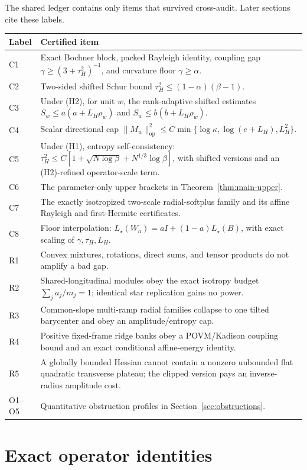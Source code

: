 \documentclass[11pt]{article}
\numberwithin{equation}{section}
\newcommand{\op}{\mathrm{op}}
\begin{document}
The shared ledger contains only items that survived cross-audit.  Later
sections cite these labels.
\begin{longtable}{@{}p{}p{}@{}}
\toprule
Label & Certified item\\
\midrule
\endhead
C1 & Exact Bochner block, packed Rayleigh identity, coupling gap
$\gamma\ge(3+\tau_H^2)^{-1}$, and curvature floor $\gamma\ge\alpha$.\\
C2 & Two-sided shifted Schur bound
$\tau_H^2\le(1-\alpha)(\beta-1)$.\\
C3 & Under (H2), for unit $w$, the rank-adaptive shifted estimates
$S_w\le a(a+L_H\rho_w)$ and $S_w\le b(b+L_H\rho_w)$.\\
C4 & Scalar directional cap
$\|M_w\|_{\op}^2\le C\min\{\log\kappa,\log(e+L_H),L_H^2\}$.\\
C5 & Under (H1), entropy self-consistency:
$\tau_H^2\le C[1+\sqrt{N\log\beta}+N^{1/3}\log\beta]$, with shifted
versions and an (H2)-refined operator-scale term.\\
C6 & The parameter-only upper brackets in Theorem~\ref{thm:main-upper}.\\
C7 & The exactly isotropized two-scale radial-softplus family and its affine
Rayleigh and first-Hermite certificates.\\
C8 & Floor interpolation:
$L_\star(W_a)=aI+(1-a)L_\star(B)$, with exact scaling of
$\gamma,\tau_H,L_H$.\\
R1 & Convex mixtures, rotations, direct sums, and tensor products do not
amplify a bad gap.\\
R2 & Shared-longitudinal modules obey the exact isotropy budget
$\sum_j a_j/m_j=1$; identical star replication gains no power.\\
R3 & Common-slope multi-ramp radial families collapse to one tilted
barycenter and obey an amplitude/entropy cap.\\
R4 & Positive fixed-frame ridge banks obey a POVM/Kadison coupling bound and
an exact conditional affine-energy identity.\\
R5 & A globally bounded Hessian cannot contain a nonzero unbounded flat
quadratic transverse plateau; the clipped version pays an inverse-radius
amplitude cost.\\
O1--O5 & Quantitative obstruction profiles in Section~\ref{sec:obstructions}.\\
\bottomrule
\end{longtable}

\section{Exact operator identities}\label{sec:operator}
\end{document}
